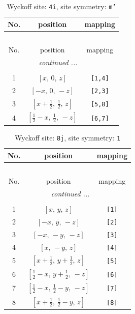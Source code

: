 \documentclass[fleqn,8pt]{jsarticle}
\begin{document}
\renewcommand{\arraystretch}{1.2}
\begin{longtable}{ccc}
\caption{Wyckoff site: {\tt 4i}, site symmetry: {\tt m'}}
 \\
 \hline \hline
No. & position & mapping \\ \hline \endfirsthead

\multicolumn{2}{l}{\tablename\ \thetable{}} \\
 \hline \hline
No. & position & mapping \\ \hline \endhead

 \hline \hline
\multicolumn{2}{r}{\footnotesize\it continued ...} \\ \endfoot

 \hline \hline
\multicolumn{2}{r}{} \\ \endlastfoot

1 & $\left[ x,\, 0,\, z \right]$ & {\tt [1,4]} \\ \hline
2 & $\left[ - x,\, 0,\, - z \right]$ & {\tt [2,3]} \\ \hline
3 & $\left[ x + \frac{1}{2},\, \frac{1}{2},\, z \right]$ & {\tt [5,8]} \\ \hline
4 & $\left[ \frac{1}{2} - x,\, \frac{1}{2},\, - z \right]$ & {\tt [6,7]} \\
\end{longtable}
\renewcommand{\arraystretch}{1.2}
\begin{longtable}{ccc}
\caption{Wyckoff site: {\tt 8j}, site symmetry: {\tt 1}}
 \\
 \hline \hline
No. & position & mapping \\ \hline \endfirsthead

\multicolumn{2}{l}{\tablename\ \thetable{}} \\
 \hline \hline
No. & position & mapping \\ \hline \endhead

 \hline \hline
\multicolumn{2}{r}{\footnotesize\it continued ...} \\ \endfoot

 \hline \hline
\multicolumn{2}{r}{} \\ \endlastfoot

1 & $\left[ x,\, y,\, z \right]$ & {\tt [1]} \\ \hline
2 & $\left[ - x,\, y,\, - z \right]$ & {\tt [2]} \\ \hline
3 & $\left[ - x,\, - y,\, - z \right]$ & {\tt [3]} \\ \hline
4 & $\left[ x,\, - y,\, z \right]$ & {\tt [4]} \\ \hline
5 & $\left[ x + \frac{1}{2},\, y + \frac{1}{2},\, z \right]$ & {\tt [5]} \\ \hline
6 & $\left[ \frac{1}{2} - x,\, y + \frac{1}{2},\, - z \right]$ & {\tt [6]} \\ \hline
7 & $\left[ \frac{1}{2} - x,\, \frac{1}{2} - y,\, - z \right]$ & {\tt [7]} \\ \hline
8 & $\left[ x + \frac{1}{2},\, \frac{1}{2} - y,\, z \right]$ & {\tt [8]} \\
\end{longtable}
\end{document}
